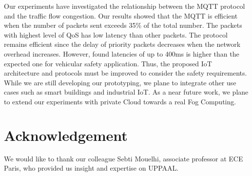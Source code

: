 Our experiments have investigated the relationship between the MQTT protocol and the traffic flow congestion. Our results showed that the MQTT is efficient when the number of packets sent exceeds 35\% of the total number. The packets with highest level of QoS has low latency than other packets. The protocol remains efficient since the delay of priority packets decreases when the network overhead increases. However, found latencies of up to 400ms is higher than the expected one for vehicular safety application. Thus, the proposed IoT architecture and protocols must be improved to consider the safety requirements. 
While we are still developing our prototyping, we plane to integrate other use cases such as smart buildings and industrial IoT.
As a near future work, we plane to extend our experiments with private Cloud towards a real Fog Computing.

\section*{Acknowledgement}

We would like to thank our colleague Sebti Mouelhi, associate professor at ECE Paris, who provided us insight and expertise on UPPAAL.


%
%



%


